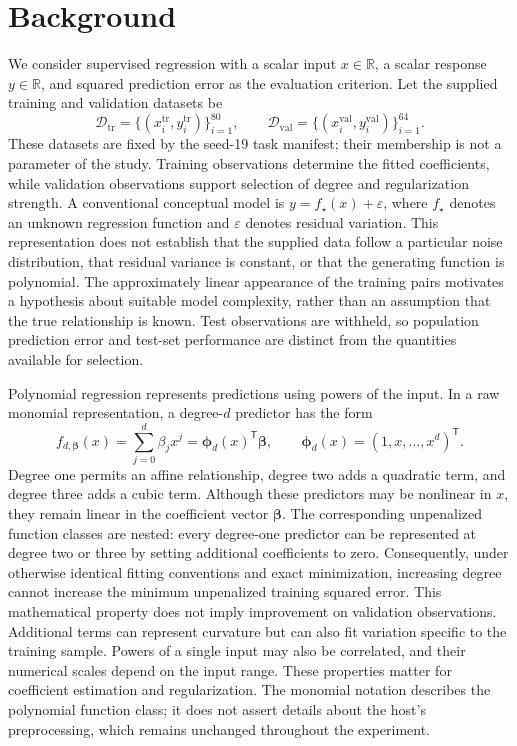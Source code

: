 \documentclass[11pt]{article}
\begin{document}
\section{Background}
We consider supervised regression with a scalar input \(x\in\mathbb{R}\), a scalar response \(y\in\mathbb{R}\), and squared prediction error as the evaluation criterion. Let the supplied training and validation datasets be
\[
\mathcal{D}_{\mathrm{tr}}
 = \{(x_i^{\mathrm{tr}},y_i^{\mathrm{tr}})\}_{i=1}^{80},
\qquad
\mathcal{D}_{\mathrm{val}}
 = \{(x_i^{\mathrm{val}},y_i^{\mathrm{val}})\}_{i=1}^{64}.
\]
These datasets are fixed by the seed-19 task manifest; their membership is not a parameter of the study. Training observations determine the fitted coefficients, while validation observations support selection of degree and regularization strength. A conventional conceptual model is \(y=f_{\star}(x)+\varepsilon\), where \(f_{\star}\) denotes an unknown regression function and \(\varepsilon\) denotes residual variation. This representation does not establish that the supplied data follow a particular noise distribution, that residual variance is constant, or that the generating function is polynomial. The approximately linear appearance of the training pairs motivates a hypothesis about suitable model complexity, rather than an assumption that the true relationship is known. Test observations are withheld, so population prediction error and test-set performance are distinct from the quantities available for selection.

Polynomial regression represents predictions using powers of the input. In a raw monomial representation, a degree-\(d\) predictor has the form
\[
f_{d,\boldsymbol{\beta}}(x)
 = \sum_{j=0}^{d}\beta_j x^j
 = \boldsymbol{\phi}_d(x)^{\mathsf T}\boldsymbol{\beta},
\qquad
\boldsymbol{\phi}_d(x)=(1,x,\ldots,x^d)^{\mathsf T}.
\]
Degree one permits an affine relationship, degree two adds a quadratic term, and degree three adds a cubic term. Although these predictors may be nonlinear in \(x\), they remain linear in the coefficient vector \(\boldsymbol{\beta}\). The corresponding unpenalized function classes are nested: every degree-one predictor can be represented at degree two or three by setting additional coefficients to zero. Consequently, under otherwise identical fitting conventions and exact minimization, increasing degree cannot increase the minimum unpenalized training squared error. This mathematical property does not imply improvement on validation observations. Additional terms can represent curvature but can also fit variation specific to the training sample. Powers of a single input may also be correlated, and their numerical scales depend on the input range. These properties matter for coefficient estimation and regularization. The monomial notation describes the polynomial function class; it does not assert details about the host's preprocessing, which remains unchanged throughout the experiment.
\end{document}
